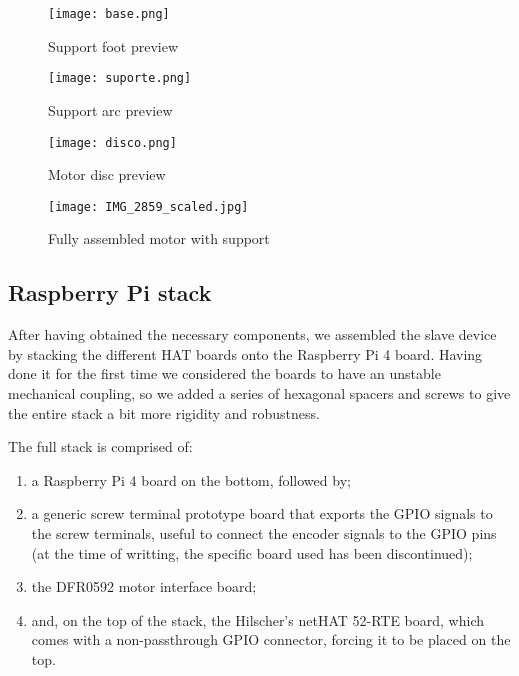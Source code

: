 \begin{figure}[htp]
	\centering
	\texttt{[image: base.png]}
	\caption{Support foot preview}
	\label{fig:support_base}
\end{figure}
\begin{figure}[htp]
	\centering
	\texttt{[image: suporte.png]}
	\caption{Support arc preview}
	\label{fig:support_arc}
\end{figure}
\begin{figure}[htp]
	\centering
	\texttt{[image: disco.png]}
	\caption{Motor disc preview}
	\label{fig:support_disc}
\end{figure}
\begin{figure}[htp]
	\centering
	\texttt{[image: IMG\_2859\_scaled.jpg]}
	\caption{Fully assembled motor with support}
	\label{fig:final_motor_stage}
\end{figure}

\subsection{Raspberry Pi stack}

After having obtained the necessary components, we assembled the slave device by stacking the different HAT boards onto the Raspberry Pi 4 board.
Having done it for the first time we considered the boards to have an unstable mechanical coupling, so we added a series of hexagonal spacers and screws to give the entire stack a bit more rigidity and robustness.

The full stack is comprised of:
\begin{enumerate}
	\item a Raspberry Pi 4 board \cite{product:rpi4} on the bottom, followed by;
	\item a generic screw terminal prototype board that exports the GPIO signals to the screw terminals, useful to connect the encoder signals to the GPIO pins (at the time of writting, the specific board used has been discontinued);
	\item the DFR0592 motor interface board;
	\item and, on the top of the stack, the Hilscher's netHAT 52-RTE board, which comes with a non-passthrough GPIO connector, forcing it to be placed on the top.
\end{enumerate}

